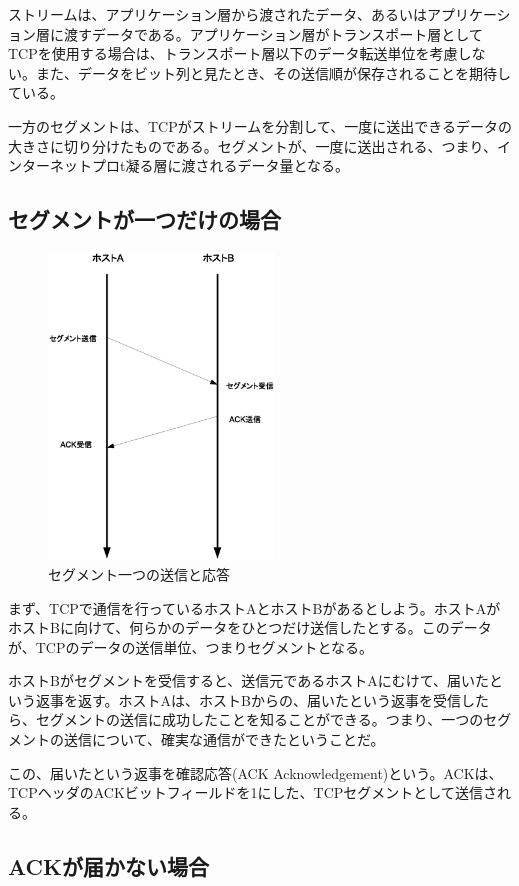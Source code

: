 ストリームは、アプリケーション層から渡されたデータ、あるいはアプリケーション層に渡すデータである。アプリケーション層がトランスポート層としてTCPを使用する場合は、トランスポート層以下のデータ転送単位を考慮しない。また、データをビット列と見たとき、その送信順が保存されることを期待している。

一方のセグメントは、TCPがストリームを分割して、一度に送出できるデータの大きさに切り分けたものである。セグメントが、一度に送出される、つまり、インターネットプロt凝る層に渡されるデータ量となる。

\subsection{セグメントが一つだけの場合}
\begin{figure}
	\includegraphics[width=6cm, clip]{draw/tcp01n.eps}
	\caption{セグメント一つの送信と応答}
	\label{fig:tcp01}
\end{figure}

まず、TCPで通信を行っているホストAとホストBがあるとしよう。ホストAがホストBに向けて、何らかのデータをひとつだけ送信したとする。このデータが、TCPのデータの送信単位、つまりセグメントとなる。

ホストBがセグメントを受信すると、送信元であるホストAにむけて、届いたという返事を返す。ホストAは、ホストBからの、届いたという返事を受信したら、セグメントの送信に成功したことを知ることができる。つまり、一つのセグメントの送信について、確実な通信ができたということだ。

この、届いたという返事を確認応答(ACK Acknowledgement)という。ACKは、TCPヘッダのACKビットフィールドを1にした、TCPセグメントとして送信される。

\subsection{ACKが届かない場合}


